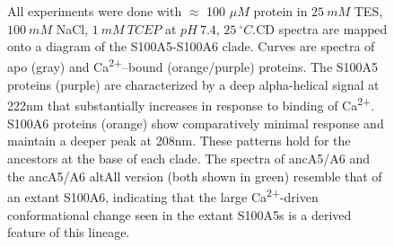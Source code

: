 \begin{figure}
{All experiments were done with $\approx$ 100 $\mu M$ protein in $25\ mM$
TES, $100\ mM$ NaCl, $1\ mM\ TCEP$ at $pH\ 7.4$, $25\ ^{\circ}C$.CD spectra are mapped onto a diagram of the S100A5-S100A6
clade. Curves are spectra of apo (gray) and Ca\textsuperscript{2+}–bound
(orange/purple) proteins. The S100A5 proteins (purple) are characterized
by a deep alpha-helical signal at 222nm that substantially increases
in response to binding of Ca\textsuperscript{2+}. S100A6 proteins
(orange) show comparatively minimal response and maintain a deeper
peak at 208nm. These patterns hold for the ancestors at the base of
each clade. The spectra of ancA5/A6 and the ancA5/A6 altAll version
(both shown in green) resemble that of an extant S100A6, indicating
that the large Ca\textsuperscript{2+}-driven conformational change
seen in the extant S100A5s is a derived feature of this lineage.\label{samplefigure}}	
\end{figure}


